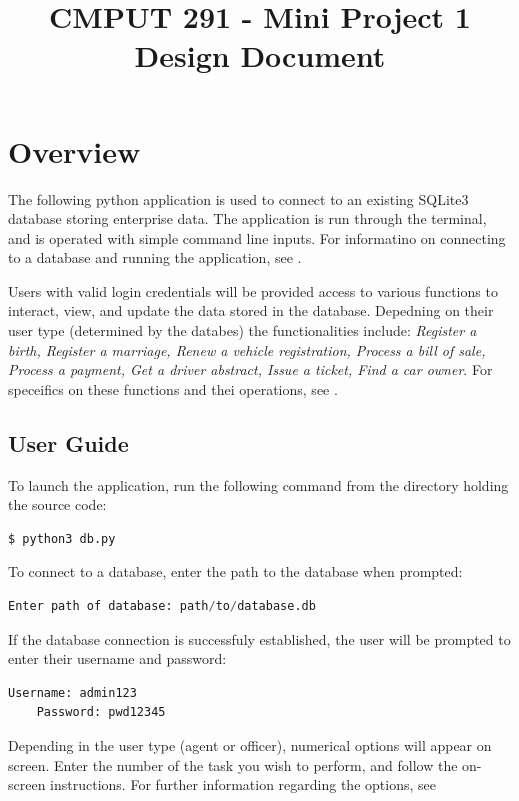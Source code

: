 \documentclass[11pt, a4paper]{article}
\begin{document}
{\selectfont

\title{\vspace{-20mm}CMPUT 291 - Mini Project 1 Design Document}
\date{}
\maketitle
\vspace{-20mm}
\section{Overview}\label{OV}
The following python application is used to connect to an existing SQLite3 database storing enterprise data. The application is run through the terminal, and is operated with simple command line inputs. For informatino on connecting to a database and running the application, see \emph{}.

Users with valid login credentials will be provided access to various functions to interact, view, and update the data stored in the database. Depedning on their user type (determined by the databes) the functionalities include: \emph{Register a birth, Register a marriage, Renew a vehicle registration, Process a bill of sale, Process a payment, Get a driver abstract, Issue a ticket, Find a car owner}. For speceifics on these functions and thei operations, see \emph{}.

\subsection{User Guide}\label{UG}
To launch the application, run the following command from the directory holding the source code:
\begin{centering}
\begin{lstlisting}[language=Python]
	$ python3 db.py
\end{lstlisting}
\end{centering}
To connect to a database, enter the path to the database when prompted:
\begin{lstlisting}[language=Python]
	Enter path of database: path/to/database.db
\end{lstlisting}
If the database connection is successfuly established, the user will be prompted to enter their username and password:
\begin{lstlisting}[language=Python]		
	Username: admin123
	Password: pwd12345
\end{lstlisting}
Depending in the user type (agent or officer), numerical options will appear on screen. Enter the number of the task you wish to perform, and follow the on-screen instructions. For further information regarding the options, see \emph{}


}
\end{document}

